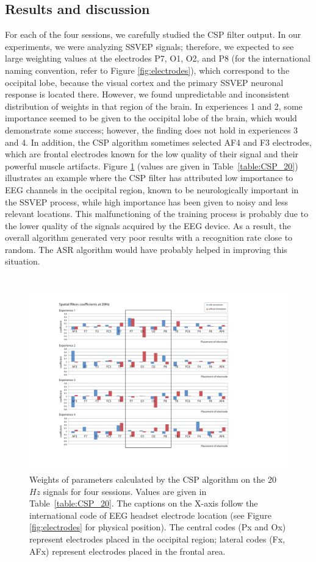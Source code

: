\documentclass[smallextended]{svjour3}
\begin{document}
\subsection{Results and discussion}
For each of the four sessions, we carefully studied the CSP filter output.
In our experiments, we were analyzing SSVEP signals; therefore, we expected to see large weighting values at the electrodes P7, O1, O2, and P8 (for the international naming convention, refer to Figure \ref{fig:electrodes}), which correspond to the occipital lobe, because the visual cortex and the primary SSVEP neuronal response is located there. However, we found unpredictable and inconsistent distribution of weights in that region of the brain.
In experiences 1 and 2, some importance seemed to be given to the occipital lobe of the brain, which would demonstrate some success; however, the finding does not hold in experiences 3 and 4.
In addition, the CSP algorithm sometimes selected AF4 and F3 electrodes, which are frontal electrodes known for the low quality of their signal and their powerful muscle artifacts.
Figure \ref{fig:CSP_20} (values are given in Table~\ref{table:CSP_20}) illustrates an example where the CSP filter has attributed low importance to EEG channels in the occipital region, known to be neurologically important in the SSVEP process, while high importance has been given to noisy and less relevant locations. This malfunctioning of the training process is probably due to the lower quality of the signals acquired by the EEG device. As a result, the overall algorithm generated very poor results with a recognition rate close to random.
The ASR algorithm would have probably helped in improving this situation.\\
\\
\begin{figure}
\center
\includegraphics[width = \textwidth] {figures/CSP-20Hz-all.pdf}
\caption{Weights of parameters calculated by the CSP algorithm on the 20\,$Hz$ signals for four sessions. Values are given in Table~\ref{table:CSP_20}. The captions on the X-axis follow the international code of EEG headset electrode location (see Figure \ref{fig:electrodes} for physical position). The central codes (Px and Ox) represent electrodes placed in the occipital region; lateral codes (Fx, AFx) represent electrodes placed in the frontal area.} \label{fig:CSP_20}
\end{figure}
\end{document}
